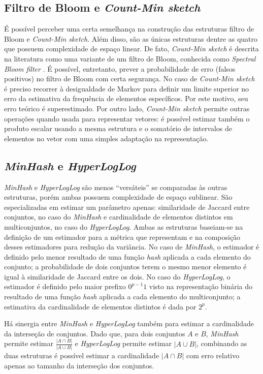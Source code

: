 \subsection{Filtro de Bloom e \emph{Count-Min sketch}}

É possível perceber uma certa semelhança na construção das estruturas filtro de Bloom e \emph{Count-Min sketch}. Além disso, são as únicas estruturas dentre as quatro que possuem complexidade de espaço linear. De fato, \emph{Count-Min sketch} é descrita na literatura como uma variante de um filtro de Bloom, conhecida como \emph{Spectral Bloom filter} \cite{cohen2003spectral}. É possível, entretanto, prever a probabilidade de erro (falsos positivos) no filtro de Bloom com certa segurança. No caso de \emph{Count-Min sketch} é preciso recorrer à desigualdade de Markov para definir um limite superior no erro da estimativa da frequência de elementos específicos. Por este motivo, seu erro teórico é superestimado. Por outro lado, \emph{Count-Min sketch} permite outras operações quando usada para representar vetores: é possível estimar também o produto escalar usando a mesma estrutura e o somatório de intervalos de elementos no vetor com uma simples adaptação na representação.

\subsection{\emph{MinHash} e \emph{HyperLogLog}}

\emph{MinHash} e \emph{HyperLogLog} são menos ``versáteis'' se comparadas às outras estruturas, porém ambas possuem complexidade de espaço sublinear. São especializadas em estimar um parâmetro apenas: similaridade de Jaccard entre conjuntos, no caso do \emph{MinHash} e cardinalidade de elementos distintos em multiconjuntos, no caso do \emph{HyperLogLog}. Ambas as estruturas baseiam-se na definição de um estimador para a métrica que representam e na composição desses estimadores para redução da variância. No caso de \emph{MinHash}, o estimador é definido pelo menor resultado de uma função \emph{hash} aplicada a cada elemento do conjunto; a probabilidade de dois conjuntos terem o mesmo menor elemento é igual à similaridade de Jaccard entre os dois. No caso do \emph{HyperLogLog}, o estimador é definido pelo maior prefixo $0^{p-1}1$ visto na representação binária do resultado de uma função \emph{hash} aplicada a cada elemento do multiconjunto; a estimativa da cardinalidade de elementos distintos é dada por $2^p$.

Há sinergia entre \emph{MinHash} e \emph{HyperLogLog} também para estimar a cardinalidade da interseção de conjuntos. Dado que, para dois conjuntos $A$ e $B$, \emph{MinHash} permite estimar $\frac{|A \cap B|}{|A \cup B|}$ e \emph{HyperLogLog} permite estimar $|A \cup B|$, combinando as duas estruturas é possível estimar a cardinalidade $|A \cap B|$ com erro relativo apenas ao tamanho da interseção dos conjuntos.
